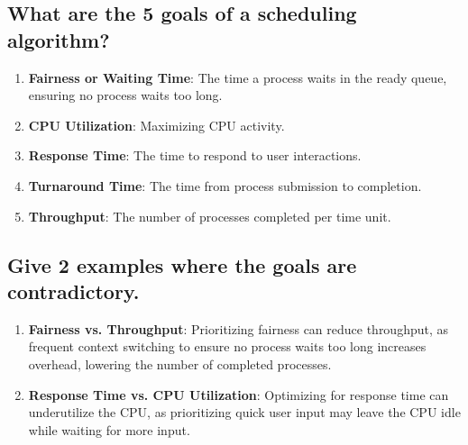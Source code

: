 \subsection*{What are the 5 goals of a scheduling algorithm?}
    \begin{enumerate}[label=\arabic*.]
        \item \textbf{Fairness or Waiting Time}: 
        The time a process waits in the ready queue, ensuring no process waits too long.
        \item \textbf{CPU Utilization}: 
        Maximizing CPU activity.
        \item \textbf{Response Time}: 
        The time to respond to user interactions.
        \item \textbf{Turnaround Time}: 
        The time from process submission to completion.
        \item \textbf{Throughput}: 
        The number of processes completed per time unit.
    \end{enumerate}

\subsection*{Give 2 examples where the goals are contradictory.}
    \begin{enumerate}[label=\arabic*.]
        \item \textbf{Fairness vs. Throughput}: 
        Prioritizing fairness can reduce throughput, as frequent context switching to ensure no process waits too long increases overhead, lowering the number of completed processes.
        \item \textbf{Response Time vs. CPU Utilization}: 
        Optimizing for response time can underutilize the CPU, as prioritizing quick user input may leave the CPU idle while waiting for more input.
    \end{enumerate}